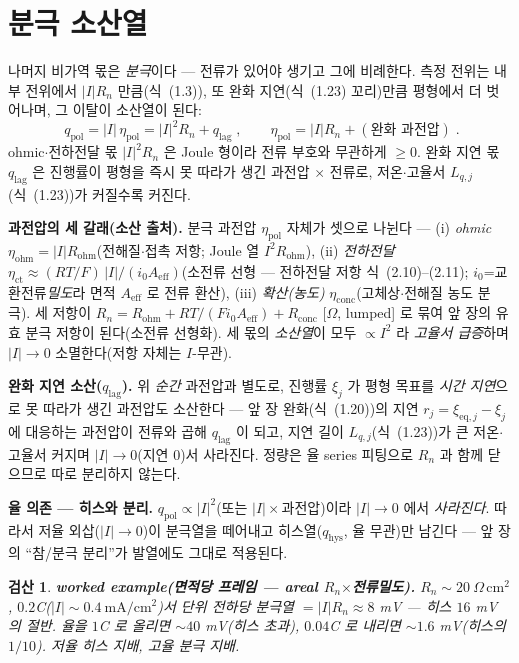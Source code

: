 \documentclass[11pt,a4paper]{article}
\newtheorem*{verifybox}{검산}
\newcommand{\eq}{\mathrm{eq}}
\newcommand{\hys}{\mathrm{hys}}
\newcommand{\pol}{\mathrm{pol}}
\newcommand{\ohm}{\mathrm{ohm}}
\newcommand{\lag}{\mathrm{lag}}
\begin{document}
\section{분극 소산열}\label{sec:h_pol}
나머지 비가역 몫은 \emph{분극}이다 — 전류가 있어야 생기고 그에 비례한다. 측정 전위는 내부 전위에서 $|I|R_n$
만큼(식~(1.3)), 또 완화 지연(식~(1.23) 꼬리)만큼 평형에서 더 벗어나며, 그 이탈이 소산열이 된다:
\begin{equation}
\boxed{\;q_\pol=|I|\,\eta_\pol=|I|^2R_n+q_\lag\;,\qquad \eta_\pol=|I|R_n+(\text{완화 과전압})\;.}
\label{eq:h_qpol}
\end{equation}
ohmic$\cdot$전하전달 몫 $|I|^2R_n$ 은 Joule 형이라 전류 부호와 무관하게 $\ge0$. 완화 지연 몫 $q_\lag$ 은 진행률이
평형을 즉시 못 따라가 생긴 과전압 $\times$ 전류로, 저온$\cdot$고율서 $L_{q,j}$(식~(1.23))가 커질수록 커진다.

\textbf{과전압의 세 갈래(소산 출처).} 분극 과전압 $\eta_\pol$ 자체가 셋으로 나뉜다 — (i) \emph{ohmic}
$\eta_\ohm=|I|R_\ohm$(전해질$\cdot$접촉 저항; Joule 열 $I^2R_\ohm$), (ii) \emph{전하전달} $\eta_\mathrm{ct}\approx
(RT/F)\,|I|/(i_0A_\mathrm{eff})$(소전류 선형 — 전하전달 저항 식~(2.10)–(2.11); $i_0$=교환전류\emph{밀도}라 면적
$A_\mathrm{eff}$ 로 전류 환산), (iii) \emph{확산(농도)}
$\eta_\mathrm{conc}$(고체상$\cdot$전해질 농도 분극). 세 저항이 $R_n=R_\ohm+RT/(Fi_0A_\mathrm{eff})+R_\mathrm{conc}$
[$\Omega$, lumped] 로 묶여 앞 장의 유효 분극 저항이 된다(소전류 선형화). 세 몫의 \emph{소산열}이 모두 $\propto I^2$ 라 \emph{고율서 급증}하며 $|I|\to0$ 소멸한다(저항 자체는 $I$-무관).

\textbf{완화 지연 소산($q_\lag$).} 위 \emph{순간} 과전압과 별도로, 진행률 $\xi_j$ 가 평형 목표를 \emph{시간 지연}으로
못 따라가 생긴 과전압도 소산한다 — 앞 장 완화(식~(1.20))의 지연 $r_j=\xi_{\eq,j}-\xi_j$ 에 대응하는 과전압이
전류와 곱해 $q_\lag$ 이 되고, 지연 길이 $L_{q,j}$(식~(1.23))가 큰 저온$\cdot$고율서 커지며 $|I|\to0$(지연 $0$)서
사라진다. 정량은 율 series 피팅으로 $R_n$ 과 함께 닫으므로 따로 분리하지 않는다.

\textbf{율 의존 — 히스와 분리.} $q_\pol\propto|I|^2$(또는 $|I|\times$과전압)이라 $|I|\to0$ 에서 \emph{사라진다}.
따라서 저율 외삽($|I|\to0$)이 분극열을 떼어내고 히스열($q_\hys$, 율 무관)만 남긴다 — 앞 장의 ``참/분극
분리''가 발열에도 그대로 적용된다.
\begin{verifybox}
\textbf{worked example(면적당 프레임 — areal $R_n$$\times$전류밀도).} $R_n\sim20\ \Omega\,\mathrm{cm^2}$, $0.2$C($|I|\sim0.4\ \mathrm{mA/cm^2}$)서 단위 전하당
분극열 $=|I|R_n\approx8$ mV — 히스 $16$ mV 의 절반. 율을 $1$C 로 올리면 $\sim40$ mV(히스 초과), $0.04$C 로 내리면
$\sim1.6$ mV(히스의 $1/10$). \emph{저율 히스 지배, 고율 분극 지배}.
\end{verifybox}
\end{document}
